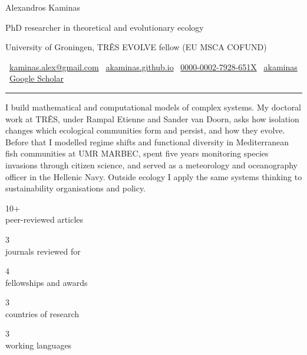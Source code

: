 \documentclass[10pt,a4paper]{article}
\newcommand{\serif}{\fontfamily{qpl}\selectfont}
\newcommand{\keyfig}[2]{%
  \begin{minipage}[t]{0.19\textwidth}\centering
    {\serif\huge\color{accent}#1}\\[1pt]
    {\footnotesize\color{muted}#2}
  \end{minipage}%
}
\begin{document}
{\serif\fontsize{30}{32}\selectfont Alexandros Kaminas}\par
\vspace{5pt}
{\large\color{accent}PhD researcher in theoretical and evolutionary ecology}\par
\vspace{2pt}
{\color{muted}University of Groningen, TR\^ES \textperiodcentered{} EVOLVE fellow (EU MSCA COFUND)}\par
\vspace{7pt}
{\small
\faEnvelope[regular]~\href{mailto:kaminas.alex@gmail.com}{kaminas.alex@gmail.com}\hspace{1.1em}
\faGlobe~\href{https://akaminas.github.io}{akaminas.github.io}\hspace{1.1em}
\faOrcid~\href{https://orcid.org/0000-0002-7928-651X}{0000-0002-7928-651X}\hspace{1.1em}
\faGithub~\href{https://github.com/akaminas}{akaminas}\hspace{1.1em}
\faGraduationCap~\href{https://scholar.google.com/citations?user=jyVZ4m4AAAAJ}{Google Scholar}
}\par
\vspace{6pt}
{\color{accent}\rule{\textwidth}{1.2pt}}\par
\vspace{8pt}

I build mathematical and computational models of complex systems. My doctoral work at TR\^ES, under Rampal Etienne and Sander van Doorn, asks how isolation changes which ecological communities form and persist, and how they evolve. Before that I modelled regime shifts and functional diversity in Mediterranean fish communities at UMR MARBEC, spent five years monitoring species invasions through citizen science, and served as a meteorology and oceanography officer in the Hellenic Navy. Outside ecology I apply the same systems thinking to sustainability organisations and policy.

\vspace{9pt}
\noindent
\keyfig{10+}{peer-reviewed articles}\hfill
\keyfig{3}{journals reviewed for}\hfill
\keyfig{4}{fellowships and awards}\hfill
\keyfig{3}{countries of research}\hfill
\keyfig{3}{working languages}\par
\vspace{8pt}
\end{document}
